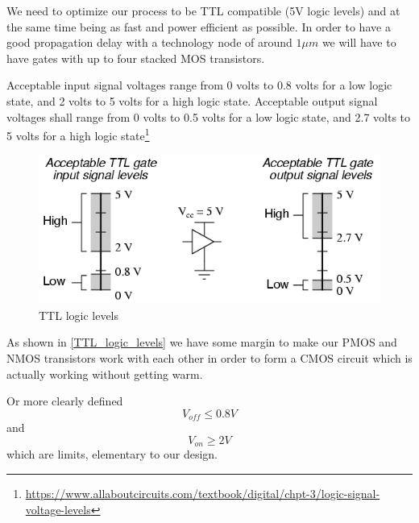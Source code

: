 We need to optimize our process to be TTL compatible (5V logic levels) and at the same time being as fast and power efficient as possible.
In order to have a good propagation delay with a technology node of around $1\mu m$ we will have to have gates with up to four stacked MOS transistors.

Acceptable input signal voltages range from 0 volts to 0.8 volts for a low logic state, and 2 volts to 5 volts for a high logic state.
Acceptable output signal voltages shall range from 0 volts to 0.5 volts for a low logic state, and 2.7 volts to 5 volts for a high logic state\footnote{\url{https://www.allaboutcircuits.com/textbook/digital/chpt-3/logic-signal-voltage-levels}}

\begin{figure}[H]
	\centering
	\includegraphics[scale=0.5]{logic_levels.png}
	\caption{TTL logic levels}
	\label{TTL_logic_levels}
\end{figure}

As shown in \autoref{TTL_logic_levels} we have some margin to make our PMOS and NMOS transistors work with each other in order to form a CMOS circuit which is actually working without getting warm.

Or more clearly defined
\begin{equation}
V_{off} \leq 0.8V
\end{equation}
and
\begin{equation}
V_{on} \geq 2V
\end{equation}
which are limits, elementary to our design.

